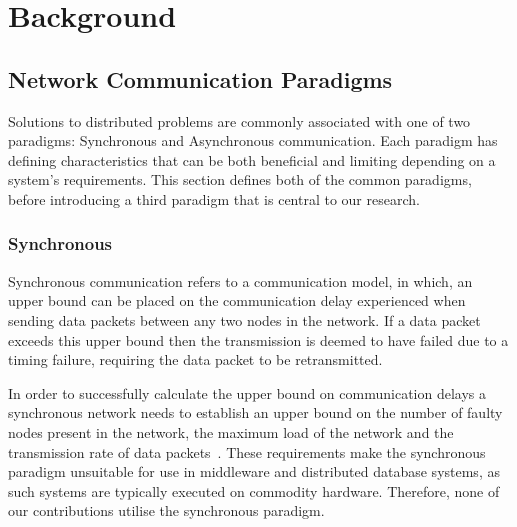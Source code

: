 
 \chapter{Background}

\ifpdf
    \graphicspath{{Chapter2-Background/Figs/Raster/}{Chapter2-Background/Figs/PDF/}{Chapter2-Background/Figs/}}
\else
    \graphicspath{{Chapter2-Background/Figs/Vector/}{Chapter2-Background/Figs/}}
\fi


\section[Network Communication Paradigms]{Network Communication Paradigms}
Solutions to distributed problems are commonly associated with one of two paradigms: Synchronous and Asynchronous communication. Each paradigm has defining characteristics that can be both beneficial and limiting depending on a system's requirements.  This section defines both of the common paradigms, before introducing a third paradigm that is central to our research.  

	\subsection{Synchronous}
	Synchronous communication refers to a communication model, in which, an upper bound can be placed on the communication delay experienced when sending data packets between any two nodes in the network. If a data packet exceeds this upper bound then the transmission is deemed to have failed due to a timing failure, requiring the data packet to be retransmitted. 
	
	In order to successfully calculate the upper bound on communication delays a synchronous network needs to establish an upper bound on the number of faulty nodes present in the network, the maximum load of the network and the transmission rate of data packets~\cite{Cristian:1996:SA:227210.227231}. These requirements make the synchronous paradigm unsuitable for use in middleware and distributed database systems, as such systems are typically executed on commodity hardware.  Therefore, none of our contributions utilise the synchronous paradigm.  
	 
